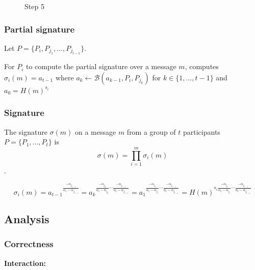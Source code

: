 \begin{figure}
        \begin{center}
        \end{center}
\caption{Step 5}
\end{figure}

\subsubsection*{Partial signature}
Let $P = \{P_i, P_{j_1}, \dots , P_{j_{t-1}} \}$.

For $P_i$ to compute the partial signature over a message $m$, computes $\sigma_i(m) = a_{t-1}$ where $a_k \leftarrow \mathcal{B}(a_{k-1},P_i,P_{j_k})$ for $k \in \{1, ... , t-1 \}$ and $a_0 = H(m)^{s_i}$

\subsubsection*{Signature}
The signature $\sigma(m)$ on a message $m$ from a group of $t$ participants $P = \{P_1, ... , P_t \}$ is
$$\sigma(m) = \prod_{i=1}^m \sigma_i(m)$$.

$$
\sigma_i (m)
= a_{t-1} {}^{\frac{- \alpha_{j_{t-1}}}{\alpha_{i} - \alpha_{j_{t-1}}}}
= a_k {}^{\frac{- \alpha_{j_{k}}}{\alpha_{i} - \alpha_{j_{k}}} \cdots \frac{- \alpha_{j_{t-1}}}{\alpha_{i} - \alpha_{j_{t-1}}}}
= a_1 {}^{\frac{- \alpha_{j_{1}}}{\alpha_{i} - \alpha_{j_{1}}} \cdots \frac{- \alpha_{j_{t-1}}}{\alpha_{i} - \alpha_{j_{t-1}}}}
= H(m)^{ s_i \frac{- \alpha_{j_{1}}}{\alpha_{i} - \alpha_{j_{1}}} \cdots \frac{- \alpha_{j_{t-1}}}{\alpha_{i} - \alpha_{j_{t-1}}}}
$$

\subsection{Analysis}
\subsubsection*{Correctness}
\textbf{Interaction:}
